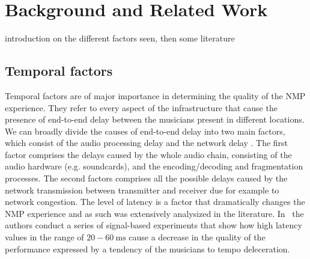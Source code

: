 \section{Background and Related Work}

introduction on the different factors seen, then some literature

\subsection{Temporal factors}
Temporal factors are of major importance in determining the quality of the NMP experience. They refer to every aspect of the infrastructure that cause the presence of end-to-end delay between the musicians present in different locations. 
We can broadly divide the causes of end-to-end delay into two main factors, which consist of the audio processing delay and the network delay \cite{Lakiotakis}. The first factor comprises the delays caused by the whole audio chain, consisting of the audio hardware (e.g. soundcards), and the encoding/decoding and fragmentation processes. The second factors comprises all the possible delays caused by the network transmission between transmitter and receiver due for example to network congestion.
The level of latency is a factor that dramatically changes the NMP experience and as such was extensively analysized in the literature. In~\cite{RottondiFeature} the authors conduct a series of signal-based experiments that show how high latency values in the range of $20-60~\mathrm{ms}$ cause a decrease in the quality of the performance expressed by a tendency of the musicians to tempo deleceration. 

